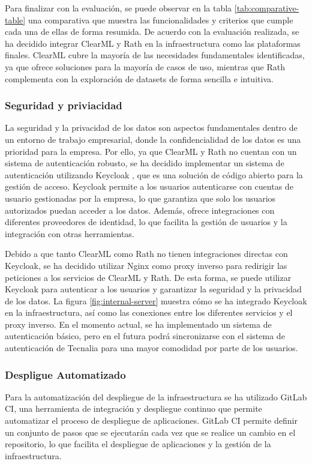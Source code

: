 Para finalizar con la evaluación, se puede observar en la tabla \ref*{tab:comparative-table} 
una comparativa que muestra
las funcionalidades y criterios que cumple cada una de ellas de forma resumida.
De acuerdo con la evaluación realizada, se ha decidido integrar ClearML y Rath
en la infraestructura como las plataformas finales. ClearML cubre la mayoría de
las necesidades fundamentales identificadas, ya que ofrece soluciones para la
mayoría de casos de uso, mientras que Rath complementa con la exploración de
datasets de forma sencilla e intuitiva.  

\subsubsection{Seguridad y priviacidad}
La seguridad y la privacidad de los datos son aspectos fundamentales dentro
de un entorno de trabajo empresarial, donde la confidencialidad de los datos
es una prioridad para la empresa. Por ello, ya que ClearML y Rath no cuentan
con un sistema de autenticación robusto, se ha decidido implementar un sistema
de autenticación utilizando Keycloak \cite{Keycloak}, que es una solución de código abierto
para la gestión de acceso. Keycloak permite a los usuarios autenticarse con
cuentas de usuario gestionadas por la empresa, lo que garantiza que solo los
usuarios autorizados puedan acceder a los datos. Además, ofrece integraciones
con diferentes proveedores de identidad, lo que facilita la gestión de
usuarios y la integración con otras herramientas.\medskip

Debido a que tanto ClearML como Rath no tienen integraciones directas con
Keycloak, se ha decidido utilizar Nginx \cite{nginx} como proxy inverso para redirigir
las peticiones a los servicios de ClearML y Rath. De esta forma, se puede
utilizar Keycloak para autenticar a los usuarios y garantizar la seguridad
y la privacidad de los datos. La figura \ref{fig:internal-server} muestra
cómo se ha integrado Keycloak en la infraestructura, así como las conexiones
entre los diferentes servicios y el proxy inverso. En el momento actual, se
ha implementado un sistema de autenticación básico, pero en el futura podrá 
sincronizarse con el sistema de autenticación de Tecnalia
para una mayor comodidad por parte de los usuarios.

\subsubsection{Despligue Automatizado}
Para la automatización del despliegue de la infraestructura se ha utilizado
GitLab CI, una herramienta de integración y despliegue continuo que
permite automatizar el proceso de despliegue de aplicaciones. GitLab CI
permite definir un conjunto de pasos que se ejecutarán cada vez que se
realice un cambio en el repositorio, lo que facilita el despliegue de
aplicaciones y la gestión de la infraestructura.\medskip

